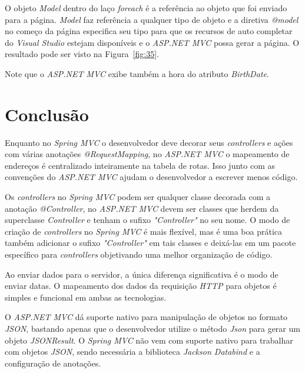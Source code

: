 O objeto \textit{Model} dentro do laço \textit{foreach} é a referência ao objeto que foi enviado para a página. \textit{Model} faz referência a qualquer tipo de objeto e a diretiva \textit{@model} no começo da página especifica seu tipo para que os recursos de auto completar do \textit{Visual Studio} estejam disponíveis e o \textit{ASP.NET MVC} possa gerar a página. O resultado pode ser visto na Figura~\ref{fig:35}.


Note que o \textit{ASP.NET MVC} exibe também a hora do atributo \textit{BirthDate}.

\section{Conclusão}

Enquanto no \textit{Spring MVC} o desenvolvedor deve decorar seus \textit{controllers} e ações com várias anotações \textit{@RequestMapping}, no \textit{ASP.NET MVC} o mapeamento de endereços é centralizado inteiramente na tabela de rotas. Isso junto com as convenções do \textit{ASP.NET MVC} ajudam o desenvolvedor a escrever menos código.

Os \textit{controllers} no \textit{Spring MVC} podem ser qualquer classe decorada com a anotação \textit{@Controller}, no \textit{ASP.NET MVC} devem ser classes que herdem da superclasse \textit{Controller} e tenham o sufixo \textit{"Controller"} no seu nome. O modo de criação de \textit{controllers} no \textit{Spring MVC} é mais flexível, mas é uma boa prática também adicionar o sufixo \textit{"Controller"} em tais classes e deixá-las em um pacote específico para \textit{controllers} objetivando uma melhor organização de código.

Ao enviar dados para o servidor, a única diferença significativa é o modo de enviar datas. O mapeamento dos dados da requisição \textit{HTTP} para objetos é simples e funcional em ambas as tecnologias.

O \textit{ASP.NET MVC} dá suporte nativo para manipulação de objetos no formato \textit{JSON}, bastando apenas que o desenvolvedor utilize o método \textit{Json} para gerar um objeto \textit{JSONResult}. O \textit{Spring MVC} não vem com suporte nativo para trabalhar com objetos \textit{JSON}, sendo necessária a biblioteca \textit{Jackson Databind} e a configuração de anotações.

